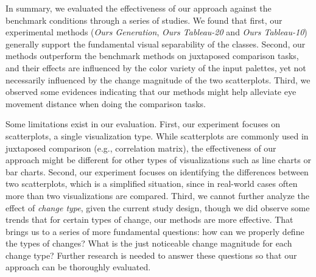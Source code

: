 In summary, we evaluated the effectiveness of our approach against the benchmark conditions through a series of studies. We found that first, our experimental methods (\emph{Ours Generation}, \emph{Ours Tableau-20} and \emph{Ours Tableau-10}) generally support the fundamental visual separability of the classes. Second, our methods outperform the benchmark methods on juxtaposed comparison tasks, and their effects are influenced by the color variety of the input palettes, yet not necessarily influenced by the change magnitude of the two scatterplots. Third, we observed some evidences indicating that our methods might help alleviate eye movement distance when doing the comparison tasks.


Some limitations exist in our evaluation.
First, our experiment focuses on scatterplots, a single visualization type. While scatterplots are commonly used in juxtaposed comparison (e.g., correlation matrix), the effectiveness of our approach might be different for other types of visualizations such as line charts or bar charts.
Second, our experiment focuses on identifying the differences between two scatterplots, which is a simplified situation, since in real-world cases often more than two visualizations are compared.
Third, we cannot further analyze the effect of \emph{change type}, given the current study design, though we did observe some trends that for certain types of change, our methods are more effective.
That brings us to a series of more fundamental questions: how can we properly define the types of changes? What is the just noticeable change magnitude for each change type?
Further research is needed to answer these questions so that our approach can be thoroughly evaluated.






